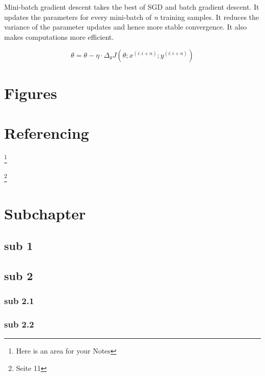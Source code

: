 \documentclass[a4paper, 12pt, oneside, BCOR1cm,toc=chapterentrywithdots]{scrbook}
\begin{document}
Mini-batch gradient descent takes the best of SGD and batch gradient descent. It updates the parameters for every mini-batch of \textit{n} training samples. It reduces the variance of the parameter updates and hence more stable convergence. It also makes computations more efficient. 

\begin{equation} \label{eqn:5}
\theta = \theta - \eta \cdot \Delta_{\theta} J(\theta; x^{(i:i+n)}; y^{(i:i+n)})
\end{equation}


\chapter{Figures}

\chapter{Referencing}

\blindtext 

\blindtext \footnote{Here is an area for your Notes}

\blindtext \footnote{Seite 11}
\blindtext 
\blindtext 


\chapter{Subchapter}

\section{sub 1}
\blindtext[3]
\section{sub 2}
\blindtext[3]
\subsection{sub 2.1}
\blindtext[3]

\subsection{sub 2.2}
\blindtext[3]





\printindex
\end{document}
